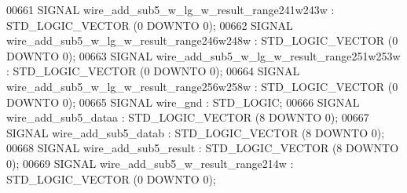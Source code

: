 \begin{DoxyCode}
{00661      \textcolor{keywordflow}{SIGNAL}  \textcolor{vhdlchar}{wire_add_sub5_w_lg_w_result_range241w243w}  \textcolor{vhdlchar}{:}   \textcolor{comment}{STD\_LOGIC\_VECTOR} \textcolor{vhdlchar}{(}\textcolor{vhdllogic}{}\textcolor{vhdllogic}{0} \textcolor{keywordflow}{DOWNTO} \textcolor{vhdllogic}{}\textcolor{vhdllogic}{0}\textcolor{vhdlchar}{)};
00662      \textcolor{keywordflow}{SIGNAL}  \textcolor{vhdlchar}{wire_add_sub5_w_lg_w_result_range246w248w}  \textcolor{vhdlchar}{:}   \textcolor{comment}{STD\_LOGIC\_VECTOR} \textcolor{vhdlchar}{(}\textcolor{vhdllogic}{}\textcolor{vhdllogic}{0} \textcolor{keywordflow}{DOWNTO} \textcolor{vhdllogic}{}\textcolor{vhdllogic}{0}\textcolor{vhdlchar}{)};
00663      \textcolor{keywordflow}{SIGNAL}  \textcolor{vhdlchar}{wire_add_sub5_w_lg_w_result_range251w253w}  \textcolor{vhdlchar}{:}   \textcolor{comment}{STD\_LOGIC\_VECTOR} \textcolor{vhdlchar}{(}\textcolor{vhdllogic}{}\textcolor{vhdllogic}{0} \textcolor{keywordflow}{DOWNTO} \textcolor{vhdllogic}{}\textcolor{vhdllogic}{0}\textcolor{vhdlchar}{)};
00664      \textcolor{keywordflow}{SIGNAL}  \textcolor{vhdlchar}{wire_add_sub5_w_lg_w_result_range256w258w}  \textcolor{vhdlchar}{:}   \textcolor{comment}{STD\_LOGIC\_VECTOR} \textcolor{vhdlchar}{(}\textcolor{vhdllogic}{}\textcolor{vhdllogic}{0} \textcolor{keywordflow}{DOWNTO} \textcolor{vhdllogic}{}\textcolor{vhdllogic}{0}\textcolor{vhdlchar}{)};
00665      \textcolor{keywordflow}{SIGNAL}  \textcolor{vhdlchar}{wire_gnd}   \textcolor{vhdlchar}{:}   \textcolor{comment}{STD\_LOGIC};
00666      \textcolor{keywordflow}{SIGNAL}  \textcolor{vhdlchar}{wire_add_sub5_dataa}    \textcolor{vhdlchar}{:}   \textcolor{comment}{STD\_LOGIC\_VECTOR} \textcolor{vhdlchar}{(}\textcolor{vhdllogic}{}\textcolor{vhdllogic}{8} \textcolor{keywordflow}{DOWNTO} \textcolor{vhdllogic}{}\textcolor{vhdllogic}{0}\textcolor{vhdlchar}{)};
00667      \textcolor{keywordflow}{SIGNAL}  \textcolor{vhdlchar}{wire_add_sub5_datab}    \textcolor{vhdlchar}{:}   \textcolor{comment}{STD\_LOGIC\_VECTOR} \textcolor{vhdlchar}{(}\textcolor{vhdllogic}{}\textcolor{vhdllogic}{8} \textcolor{keywordflow}{DOWNTO} \textcolor{vhdllogic}{}\textcolor{vhdllogic}{0}\textcolor{vhdlchar}{)};
00668      \textcolor{keywordflow}{SIGNAL}  \textcolor{vhdlchar}{wire_add_sub5_result}   \textcolor{vhdlchar}{:}   \textcolor{comment}{STD\_LOGIC\_VECTOR} \textcolor{vhdlchar}{(}\textcolor{vhdllogic}{}\textcolor{vhdllogic}{8} \textcolor{keywordflow}{DOWNTO} \textcolor{vhdllogic}{}\textcolor{vhdllogic}{0}\textcolor{vhdlchar}{)};
00669      \textcolor{keywordflow}{SIGNAL}  \textcolor{vhdlchar}{wire_add_sub5_w_result_range214w}   \textcolor{vhdlchar}{:}   \textcolor{comment}{STD\_LOGIC\_VECTOR} \textcolor{vhdlchar}{(}\textcolor{vhdllogic}{}\textcolor{vhdllogic}{0} \textcolor{keywordflow}{DOWNTO} \textcolor{vhdllogic}{}\textcolor{vhdllogic}{0}\textcolor{vhdlchar}{)};
}
\end{DoxyCode}

